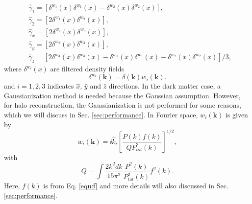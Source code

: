 \begin{equation}
\label{equ:gamma}
\begin{split}
&\hat{\gamma}_{1}=\left[\delta^{w_{1}}(x)\delta^{w_{1}}(x)-\delta^{w_{2}}(x)\delta^{w_{2}}(x) \right],\\
&\hat{\gamma}_{2}=[2\delta^{w_{1}}(x)\delta^{w_{2}}(x)],\\
&\hat{\gamma}_{x}=[2\delta^{w_{1}}(x)\delta^{w_{3}}(x)],\\
&\hat{\gamma}_{y}=[2\delta^{w_{2}}(x)\delta^{w_{3}}(x)],\\
&\hat{\gamma}_{z}=[2\delta^{w_{3}}(x)\delta^{w_{3}}(x)
-\delta^{w_{1}}(x)\delta^{w_{1}}(x)
-\delta^{w_{2}}(x)\delta^{w_{2}}(x)]/3,
\end{split}
\end{equation}
where $\delta^{w_{i}}(x)$ are filtered density fields
\begin{equation}
\delta^{w_{i}}(\bm{k})=\delta(\bm{k})w_{i}(\bm{k}).
\end{equation}
 and $i=1,2,3$ indicates $\hat{x}$, $\hat{y}$ and $\hat{z}$ directions.
In the dark matter case, a Gaussianization method is needed because the 
Gaussian assumption. However, for halo reconstruction, the Gaussianization
is not performed for some reasons, which we will discuss in Sec. \ref{sec:performance}.
 In Fourier space, $w_{i}(\bm{k})$ is given by
\begin{equation}
w_{i}(\bm{k})=\ii \hat{k}_{i} \left[\frac{P(k)f(k)}{QP^{2}_{tot}(k)}\right]^{1/2},
\label{equ:w}
\end{equation}
with 
\begin{equation}
Q=\int \frac{2k^{2}dk}{15\pi^{2}}\frac{P^{2}(k)}{P^{2}_{tot}(k)}f^{2}(k).
\label{equ:Q}
\end{equation}
Here, $f(k)$ is from Eq. \eqref{equ:f} and more details will also discussed in
Sec. \ref{sec:performance}.

